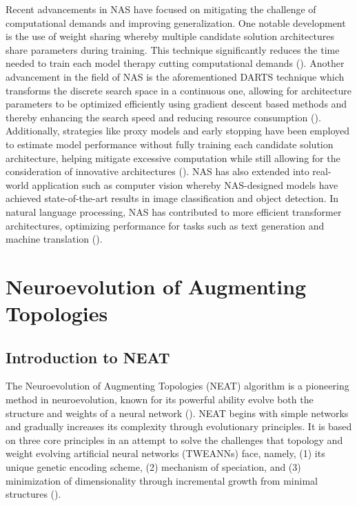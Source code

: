 \noindent Recent advancements in NAS have focused on mitigating the challenge of computational demands and improving generalization. One notable development is the use of weight sharing whereby multiple candidate solution architectures share parameters during training. This technique significantly reduces the time needed to train each model therapy cutting computational demands (\cite{pham2018efficient}). Another advancement in the field of NAS is the aforementioned DARTS technique which transforms the discrete search space in a continuous one, allowing for architecture parameters to be optimized efficiently using gradient descent based methods and thereby enhancing the search speed and reducing resource consumption (\cite{liu2021survey}). Additionally, strategies like proxy models and early stopping have been employed to estimate model performance without fully training each candidate solution architecture, helping mitigate excessive computation while still allowing for the consideration of innovative architectures (\cite{liu2021survey}). NAS has also extended into real-world application such as computer vision whereby NAS-designed models have achieved state-of-the-art results in image classification and object detection. In natural language processing, NAS has contributed to more efficient transformer architectures, optimizing performance for tasks such as text generation and machine translation (\cite{elsken2019neural}).


\section{Neuroevolution of Augmenting Topologies}\label{sec:ne_neat}
\subsection{Introduction to NEAT}
The Neuroevolution of Augmenting Topologies (NEAT) algorithm is a pioneering method in neuroevolution, known for its powerful ability evolve both the structure and weights of a neural network (\cite{stanley2019designing}). NEAT begins with simple networks and gradually increases its complexity through evolutionary principles. It is based on three core principles in an attempt to solve the challenges that topology and weight evolving artificial neural networks (TWEANNs) face, namely, (1) its unique genetic encoding scheme, (2) mechanism of speciation, and (3) minimization of dimensionality through incremental growth from minimal structures (\cite{stanley2002evolving}). \bigskip

